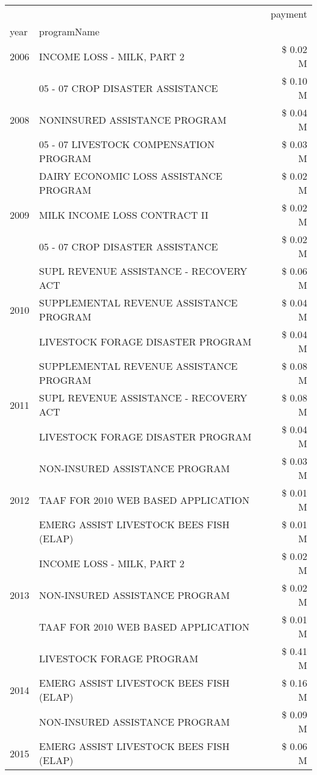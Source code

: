 \begin{tabular}{llr}
\toprule
 &  & payment \\
year & programName &  \\
\midrule
2006 & INCOME LOSS - MILK, PART 2 & \$ 0.02 M \\
\cline{1-3}
\multirow[t]{3}{*}{2008} & 05 - 07 CROP DISASTER ASSISTANCE & \$ 0.10 M \\
 & NONINSURED ASSISTANCE PROGRAM & \$ 0.04 M \\
 & 05 - 07 LIVESTOCK COMPENSATION PROGRAM & \$ 0.03 M \\
\cline{1-3}
\multirow[t]{3}{*}{2009} & DAIRY ECONOMIC LOSS ASSISTANCE PROGRAM & \$ 0.02 M \\
 & MILK INCOME LOSS CONTRACT II & \$ 0.02 M \\
 & 05 - 07 CROP DISASTER ASSISTANCE & \$ 0.02 M \\
\cline{1-3}
\multirow[t]{3}{*}{2010} & SUPL REVENUE ASSISTANCE - RECOVERY ACT & \$ 0.06 M \\
 & SUPPLEMENTAL REVENUE ASSISTANCE PROGRAM & \$ 0.04 M \\
 & LIVESTOCK FORAGE DISASTER PROGRAM & \$ 0.04 M \\
\cline{1-3}
\multirow[t]{3}{*}{2011} & SUPPLEMENTAL REVENUE ASSISTANCE PROGRAM & \$ 0.08 M \\
 & SUPL REVENUE ASSISTANCE - RECOVERY ACT & \$ 0.08 M \\
 & LIVESTOCK FORAGE DISASTER PROGRAM & \$ 0.04 M \\
\cline{1-3}
\multirow[t]{3}{*}{2012} & NON-INSURED ASSISTANCE PROGRAM & \$ 0.03 M \\
 & TAAF FOR 2010 WEB BASED APPLICATION & \$ 0.01 M \\
 & EMERG ASSIST LIVESTOCK BEES FISH (ELAP) & \$ 0.01 M \\
\cline{1-3}
\multirow[t]{3}{*}{2013} & INCOME LOSS - MILK, PART 2 & \$ 0.02 M \\
 & NON-INSURED ASSISTANCE PROGRAM & \$ 0.02 M \\
 & TAAF FOR 2010 WEB BASED APPLICATION & \$ 0.01 M \\
\cline{1-3}
\multirow[t]{3}{*}{2014} & LIVESTOCK FORAGE PROGRAM & \$ 0.41 M \\
 & EMERG ASSIST LIVESTOCK BEES FISH (ELAP) & \$ 0.16 M \\
 & NON-INSURED ASSISTANCE PROGRAM & \$ 0.09 M \\
\cline{1-3}
\multirow[t]{3}{*}{2015} & EMERG ASSIST LIVESTOCK BEES FISH (ELAP) & \$ 0.06 M \\

\end{tabular}
